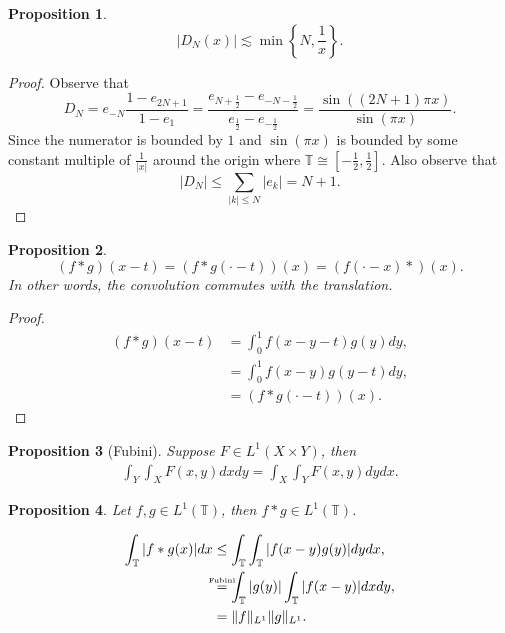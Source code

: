 \documentclass[8pt]{article}
\newtheorem{proposition}{Proposition}[section]
\newcommand{\ztext}[1]{\text{\makebox[0pt][c]{\tiny #1}}}
\newcommand{\norm}[1]{\Vert #1 \Vert}
\newcommand{\ab}[1]{\vert #1 \vert}
\newcommand{\bT}[0]{\mathbb{T}}
\begin{document}
\begin{proposition}
  \label{proposition_1_4}
  \begin{equation*}
    \ab{D_N(x)}\lesssim\min\left\{N,{\frac 1 x}\right\}.
  \end{equation*}
\end{proposition}
\begin{proof}
  Observe that 
  \begin{equation*}
    D_N = e_{-N}{\frac {1- e_{2N+1}} {1-e_1}} = {\frac {e_{N+{\frac 1 2}}-e_{-N-{\frac 1 2}}} {e_{{\frac 1 2}}-e_{-{\frac 1 2}}}} = {\frac {\sin((2N+1)\pi x)} {\sin(\pi x)}}.
  \end{equation*}
  Since the numerator is bounded by $1$ and $\sin(\pi x)$ is bounded by some constant multiple of ${\frac 1 {\vert x\vert}}$ around the origin where $\bT\cong \left[-{\frac 1 2},{\frac 1 2}\right]$. Also observe that 
  \begin{equation*}
    \vert D_N\vert \leq \sum_{\ab{k}\leq N}\ab{e_k} = N+1.
  \end{equation*}
\end{proof}

\begin{proposition}
  \begin{equation*}
    (f\ast g)(x-t) = (f\ast g(\cdot-t))(x) = (f(\cdot -x)\ast)(x).
  \end{equation*}
   In other words, the convolution commutes with the translation.
   \label{proposition_1_5}
\end{proposition}

\begin{proof}
  \begin{align*}
    (f\ast g)(x-t) & = \int_0^1f(x-y-t)g(y)dy,\\
    & = \int_0^1 f(x-y)g(y-t)dy,\\
    & = (f\ast g(\cdot-t))(x).
  \end{align*}
\end{proof}

\begin{proposition}[Fubini]
  Suppose $F\in L^1(X\times Y)$, then 
  \begin{align*}
    \int_Y\int_XF(x,y)dxdy = \int_X\int_YF(x,y)dydx.
  \end{align*}
\end{proposition}

\begin{proposition}
  Let $f,g\in L^1(\bT)$, then $f\ast g\in L^1(\bT)$.
\end{proposition}
\begin{align*}
  \int_\bT\ab{f\ast g(x)}dx&\leq \int_\bT\int_\bT\ab{f(x-y)g(y)}dydx,\\
  &\stackrel{\ztext{Fubini}}{=}\int_\bT\ab{g(y)}\int_\bT\ab{f(x-y)}dxdy,\\
  &= \norm{f}_{L^1}\norm{g}_{L^1}.
\end{align*}
\end{document}
